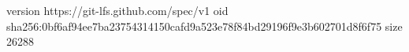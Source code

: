 version https://git-lfs.github.com/spec/v1
oid sha256:0bf6af94ee7ba23754314150cafd9a523e78f84bd29196f9e3b602701d8f6f75
size 26288
